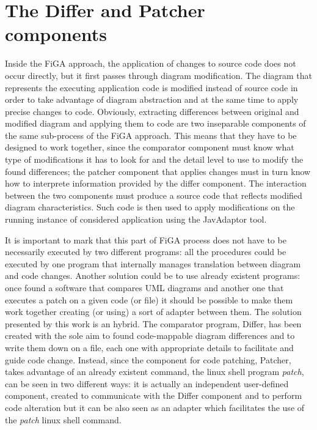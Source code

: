 \chapter{The Differ and Patcher components}\label{chap:DifferAndPatcher}
Inside the FiGA approach, the application of changes to source code does not occur directly, but it first passes through diagram modification. The diagram that represents the executing application code is modified instead of source code in order to take advantage of diagram abstraction and at the same time to apply precise changes to code. Obviously, extracting differences between original and modified diagram and applying them to code are two inseparable components of the same sub-process of the FiGA approach. This means that they have to be designed to work together, since the comparator component must know what type of modifications it has to look for and the detail level to use to modify the found differences; the patcher component that applies changes must in turn know how to interprete information provided by the differ component. The interaction between the two components must produce a source code that reflects modified diagram characteristics. Such code is then used to apply modifications on the running instance of considered application using the JavAdaptor tool.

It is important to mark that this part of FiGA process does not have to be necessarily executed by two different programs: all the procedures could be executed by one program that internally manages translation between diagram and code changes. Another solution could be to use already existent programs: once found a software that compares UML diagrams and another one that executes a patch on a given code (or file) it should be possible to make them work together creating (or using) a sort of adapter between them.
The solution presented by this work is an hybrid.
The comparator program, Differ, has been created with the sole aim to found code-mappable diagram differences and to write them down on a file, each one with appropriate details to facilitate and guide code change. Instead, since the component for code patching, Patcher, takes advantage of an already existent command, the linux shell program \textit{patch}, can be seen in two different ways: it is actually an independent user-defined component, created to communicate with the Differ component and to perform code alteration but it can be also seen as an adapter which facilitates the use of the \textit{patch} linux shell command.

